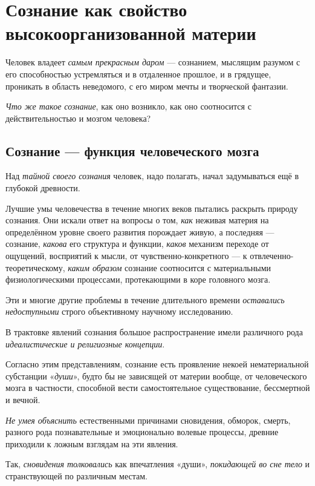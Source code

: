 \documentclass[a4paper,14pt,russian]{extreport}
\begin{document}
\section{Сознание как свойство высокоорганизованной материи}

Человек владеет \emph{самым прекрасным даром} --- сознанием, мыслящим разумом с его способностью устремляться и в отдаленное прошлое, и в грядущее, проникать в область неведомого, с его миром мечты и творческой фантазии.

\emph{Что же такое сознание}, как оно возникло, как оно соотносится с действительностью и мозгом человека?

\subsection{Сознание --- функция человеческого мозга}

Над \emph{тайной своего сознания} человек, надо полагать, начал задумываться ещё в глубокой древности.

Лучшие умы человечества в течение многих веков пытались раскрыть природу сознания. Они искали ответ на вопросы о том, \emph{как} неживая материя на определённом уровне своего развития порождает живую, а последняя --- сознание, \emph{какова} его структура и функции, \emph{каков} механизм переходе от ощущений, восприятий к мысли, от чувственно-конкретного --- к отвлеченно-теоретическому, \emph{каким образом} сознание соотносится с материальными физиологическими процессами, протекающими в коре головного мозга.

Эти и многие другие проблемы в течение длительного времени \emph{оставались недоступными} строго объективному научному исследованию.

В трактовке явлений сознания большое распространение имели различного рода \emph{идеалистические и религиозные концепции}.

Согласно этим представлениям, сознание есть проявление некоей нематериальной субстанции «\emph{души}», будто бы не зависящей от материи вообще, от человеческого мозга в частности, способной вести самостоятельное существование, бессмертной и вечной.

\emph{Не умея объяснить} естественными причинами сновидения, обморок, смерть, разного рода познавательные и эмоционально волевые процессы, древние приходили к ложным взглядам на эти явления.

Так, \emph{сновидения толковались} как впечатления «души», \emph{покидающей во сне тело} и странствующей по различным местам.
\end{document}
